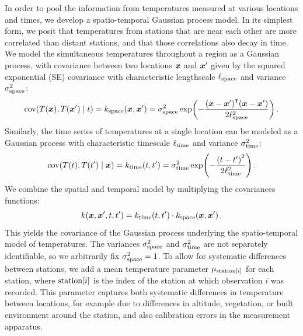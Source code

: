 \documentclass[12pt]{article}
\begin{document}
In order to pool the information from temperatures measured at various locations and times, we develop a spatio-temporal Gaussian process model.
In its simplest form, we posit that temperatures from stations that are near each other are more correlated than distant stations, and that those correlations also decay in time.
We model the simultaneous temperatures throughout a region as a Gaussian process, with covariance between two locations \(\bm{x}\) and \(\bm{x}'\) given by the squared exponential (SE) covariance with characteristic lengthscale \(\ell_{\mathrm{space}}\) and variance \(\sigma_{\mathrm{space}}^2\):
\begin{equation}
    \cov\del{T(\xvec), T(\xvec') \mid t} = k_{\subspace}(\xvec, \xvec') =  \sigma_{\subspace}^2 \exp\del{-\frac{\del{\xvec-\xvec'}\trans\del{\xvec-\xvec'}}{2\ell_{\subspace}^2}}\,.
    \label{eq:kspace}
\end{equation}
Similarly, the time series of temperatures at a single location can be modeled as a Gaussian process with characteristic timescale \(\ell_{\mathrm{time}}\) and variance \(\sigma_{\mathrm{time}}^2\):
\begin{equation}
\cov\del{T(t), T(t') \mid \xvec} = k_{\subtime}(t, t') = \sigma_{\subtime}^2 \exp\del{-\frac{\del{t-t'}^2}{2\ell_{\subtime}^2}}\,.
\end{equation}
We combine the spatial and temporal model by multiplying the covariances functions:
\begin{equation}
k(\bm{x},\bm{x}',t,t') = k_{\mathrm{time}}(t,t') \cdot k_{\mathrm{space}}(\bm{x}, \bm{x}')\,.
\end{equation}
This yields the covariance of the Gaussian process underlying the spatio-temporal model of temperatures.
The variances \(\sigma_{\mathrm{space}}^2\) and \(\sigma_{\mathrm{time}}^2\) are not separately identifiable, so we arbitrarily fix \(\sigma_{\mathrm{space}}^2=1\).
To allow for systematic differences between stations, we add a mean temperature parameter \(\mu_{\mathrm{station}\left\lbrack i\right\rbrack}\) for each station, where \(\station{i}\) is the index of the station at which observation \(i\) was recorded.
This parameter captures both systematic differences in temperature between locations, for example due to differences in altitude, vegetation, or built environment around the station, and also calibration errors in the measurement apparatus.
\end{document}

